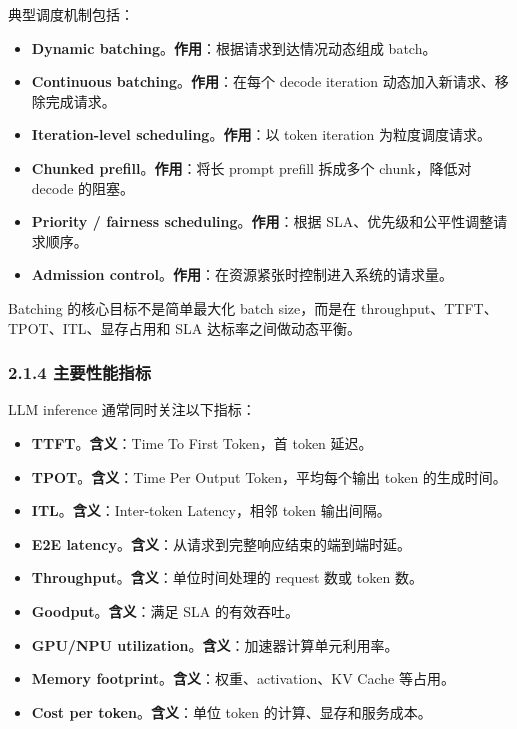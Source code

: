 \documentclass[a4paper,twocolumn,10pt]{ctexart}
\begin{document}
典型调度机制包括：



\begin{itemize}
\item \textbf{Dynamic batching}。\textbf{作用}：根据请求到达情况动态组成 batch。
\item \textbf{Continuous batching}。\textbf{作用}：在每个 decode iteration 动态加入新请求、移除完成请求。
\item \textbf{Iteration-level scheduling}。\textbf{作用}：以 token iteration 为粒度调度请求。
\item \textbf{Chunked prefill}。\textbf{作用}：将长 prompt prefill 拆成多个 chunk，降低对 decode 的阻塞。
\item \textbf{Priority / fairness scheduling}。\textbf{作用}：根据 SLA、优先级和公平性调整请求顺序。
\item \textbf{Admission control}。\textbf{作用}：在资源紧张时控制进入系统的请求量。
\end{itemize}



Batching 的核心目标不是简单最大化 batch size，而是在 throughput、TTFT、TPOT、ITL、显存占用和 SLA 达标率之间做动态平衡。




\subsubsection{2.1.4 主要性能指标}

LLM inference 通常同时关注以下指标：



\begin{itemize}
\item \textbf{TTFT}。\textbf{含义}：Time To First Token，首 token 延迟。
\item \textbf{TPOT}。\textbf{含义}：Time Per Output Token，平均每个输出 token 的生成时间。
\item \textbf{ITL}。\textbf{含义}：Inter-token Latency，相邻 token 输出间隔。
\item \textbf{E2E latency}。\textbf{含义}：从请求到完整响应结束的端到端时延。
\item \textbf{Throughput}。\textbf{含义}：单位时间处理的 request 数或 token 数。
\item \textbf{Goodput}。\textbf{含义}：满足 SLA 的有效吞吐。
\item \textbf{GPU/NPU utilization}。\textbf{含义}：加速器计算单元利用率。
\item \textbf{Memory footprint}。\textbf{含义}：权重、activation、KV Cache 等占用。
\item \textbf{Cost per token}。\textbf{含义}：单位 token 的计算、显存和服务成本。
\end{itemize}
\end{document}
